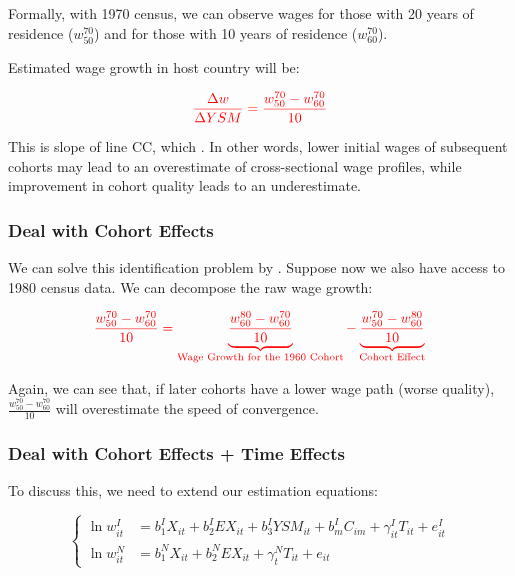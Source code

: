             Formally, with 1970 census, we can observe wages for those with 20 years of residence ($w_{50}^{70}$) and for those with 10 years of residence ($w_{60}^{70}$).
            
            Estimated wage growth in host country will be:
            
            \[\color{red} \frac{\Delta w}{\Delta YSM} = \frac{w_{50}^{70}-w_{60}^{70}}{10}\]
            
            This is slope of line CC, which . In other words, lower initial wages of subsequent cohorts may lead to an overestimate of cross-sectional wage profiles, while improvement in cohort quality leads to an underestimate.

        \subsubsection{Deal with Cohort Effects}

            We can solve this identification problem by . Suppose now we also have access to 1980 census data. We can decompose the raw wage growth:

            \begin{equation*}
                \color{red}
                \frac{w_{50}^{70} - w_{60}^{70}}{10} = \underbrace{\frac{w_{60}^{80} - w_{60}^{70}}{10}}_{\text{Wage Growth for the 1960 Cohort}} - \underbrace{\frac{w_{50}^{70} - w_{60}^{80}}{10}}_{\text{Cohort Effect}}
            \end{equation*}

            Again, we can see that, if later cohorts have a lower wage path (worse quality), $\frac{w_{50}^{70} - w_{60}^{70}}{10}$ will overestimate the speed of convergence.
        
        \subsubsection{Deal with Cohort Effects + Time Effects}

            To discuss this, we need to extend our estimation equations:

            \[
            \begin{cases}
            \ln w_{it}^I & = b_{1}^IX_{it} + b_{2}^IEX_{it} + b_{3}^IYSM_{it} + b_{m}^IC_{im} + \gamma_{it}^IT_{it} + e_{it}^I \\
            \ln w_{it}^N & = b_{1}^NX_{it} + b_{2}^NEX_{it} + \gamma_{t}^NT_{it} + e_{it}
            \end{cases}
            \]

